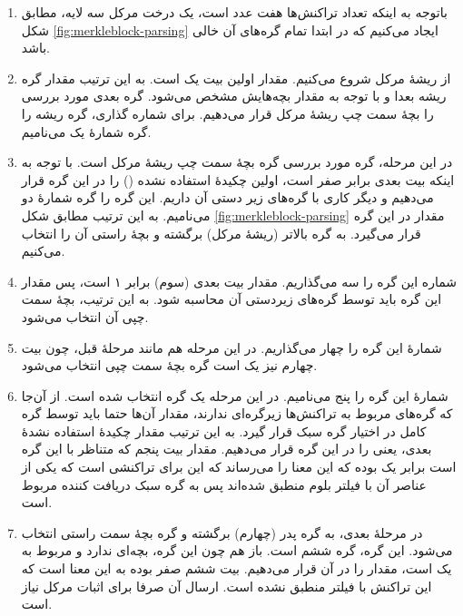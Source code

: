 \begin{enumerate}
		\item {%
		باتوجه به اینکه تعداد تراکنش‌ها هفت عدد است، یک درخت مرکل سه لایه، مطابق شکل \ref{fig:merkleblock-parsing} ایجاد می‌کنیم که در ابتدا تمام گره‌های آن خالی باشد.
	}
	\item {%
		از ریشهٔ مرکل شروع می‌کنیم. مقدار اولین بیت  یک است. به این ترتیب مقدار گره ریشه بعدا و با توجه به مقدار بچه‌هایش مشخص می‌شود. گره بعدی مورد بررسی را بچهٔ سمت چپ ریشهٔ مرکل قرار می‌دهیم. برای شماره گذاری، گره ریشه را گره شمارهٔ یک می‌نامیم.
	}

	\item {%
در این مرحله، گره مورد بررسی گره بچهٔ سمت چپ ریشهٔ مرکل است. با توجه به اینکه بیت بعدی  برابر صفر است، اولین چکیدهٔ استفاده نشده () را در این گره قرار می‌دهیم و دیگر کاری با گره‌های زیر دستی آن داریم. این گره را گره شمارهٔ دو می‌نامیم. به این ترتیب مطابق شکل \ref{fig:merkleblock-parsing} مقدار  در این گره قرار می‌گیرد. به گره بالاتر (ریشهٔ مرکل) برگشته و بچهٔ راستی آن را انتخاب می‌کنیم.
	}
	\item{%
	شماره این گره را سه می‌گذاریم. مقدار بیت بعدی (سوم)  برابر ۱ است، پس  مقدار این گره باید توسط گره‌های زیردستی آن محاسبه شود. به این ترتیب، بچهٔ سمت چپی آن انتخاب می‌شود. 
}
	\item{%
	شمارهٔ این گره را چهار می‌گذاریم. در این مرحله‌ هم مانند مرحلهٔ قبل، چون بیت چهارم  نیز یک است گره بچهٔ سمت چپی انتخاب می‌شود.
}
	\item{%
	شمارهٔ این گره را پنج می‌نامیم. در این مرحله یک گره  انتخاب شده است. از آن‌جا که گره‌های مربوط به تراکنش‌ها زیرگره‌ای ندارند، مقدار آن‌ها حتما باید توسط گره کامل در اختیار گره سبک قرار گیرد. به این ترتیب مقدار چکیدهٔ استفاده نشدهٔ بعدی، یعنی  را در این گره قرار می‌دهیم. مقدار بیت پنجم  که متناظر با این گره است برابر یک بوده که این معنا را می‌رساند که این  برای تراکنشی است که یکی از عناصر آن با فیلتر بلوم منطبق شده‌اند پس به گره سبک دریافت کننده مربوط است. 
}

	\item{%
	در مرحلهٔ بعدی، به گره پدر (چهارم) برگشته و گره بچهٔ سمت راستی انتخاب می‌شود. این گره، گره ششم است. باز هم چون این گره، بچه‌ای ندارد و مربوط به یک  است، مقدار   را در آن قرار می‌دهیم. بیت ششم  صفر بوده به این معنا است که این تراکنش با فیلتر منطبق نشده است. ارسال آن صرفا برای اثبات مرکل نیاز است.
}


\end{enumerate}
